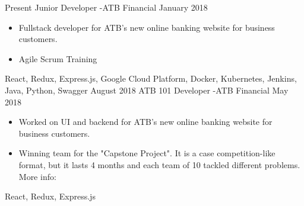 
\begin{experiences}
  \experience
    {Present}   {Junior Developer -}{ATB Financial}{}
    {January 2018} {
                      \begin{itemize}
                        \item Fullstack developer for ATB's new online banking website for business customers.
                        \item Agile Scrum Training
                      \end{itemize}
                    }
                    {
                        React,
                        Redux,
                        Express.js,
                        Google Cloud Platform,
                        Docker,
                        Kubernetes,
                        Jenkins,
                        Java,
                        Python,
                        Swagger
                    }
  \emptySeparator
  \experience
  {August 2018}   {ATB 101 Developer -}{ATB Financial}{}
  {May 2018} {
                    \begin{itemize}
                      \item Worked on UI and backend for ATB's new online banking website for business customers.
                      \item Winning team for the "Capstone Project". It is a case competition-like format,
                      but it lasts 4 months and each team of 10 tackled different problems.
                      More info: 
                    \end{itemize}
                  }
                  {
                      React,
                      Redux,
                      Express.js
                  }
\end{experiences}
